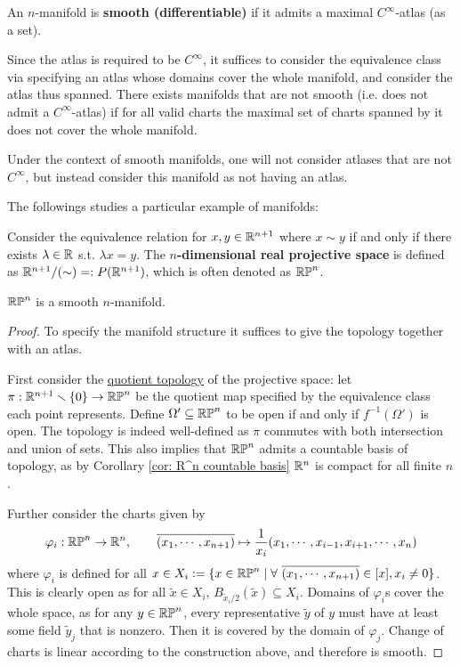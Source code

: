 \documentclass{article}
\begin{document}
\begin{definition}
    An $n$-manifold is \textbf{smooth (differentiable)} if it admits a maximal $C^{\infty}$-atlas (as a set). 
\end{definition}

\begin{remark}
    Since the atlas is required to be $C^{\infty}$, it suffices to consider the equivalence class via specifying an atlas whose domains cover the whole manifold, and consider the atlas thus spanned. There exists manifolds that are not smooth (i.e. does not admit a $C^{\infty}$-atlas) if for all valid charts the maximal set of charts spanned by it does not cover the whole manifold.
    
    Under the context of smooth manifolds, one will not consider atlases that are not $C^{\infty}$, but instead consider this manifold as not having an atlas.
\end{remark}

The followings studies a particular example of manifolds:

\begin{definition}
    Consider the equivalence relation for $x, y \in \mathbb{R}^{n+1}$ where $x \sim y$ if and only if there exists $\lambda \in \mathbb{R}$ s.t. $\lambda x = y$. The \textbf{$n$-dimensional real projective space} is defined as $\mathbb{R}^{n+1}/(\sim) =: P(\mathbb{R}^{n+1})$, which is often denoted as $\mathbb{RP}^n$.
\end{definition}

\begin{proposition}
    $\mathbb{RP}^n$ is a smooth $n$-manifold.
\end{proposition}

\begin{proof}
    To specify the manifold structure it suffices to give the topology together with an atlas. 

    First consider the \underline{quotient topology} of the projective space: let $\pi: \mathbb{R}^{n+1} \smallsetminus \{0\} \to \mathbb{RP}^n$ be the quotient map specified by the equivalence class each point represents. Define $\Omega' \subseteq \mathbb{RP}^n$ to be open if and only if $f^{-1}(\Omega')$ is open. The topology is indeed well-defined as $\pi$ commutes with both intersection and union of sets. This also implies that $\mathbb{RP}^n$ admits a countable basis of topology, as by Corollary \ref{cor: R^n countable basis} $\mathbb{R}^{n}$ is compact for all finite $n$.

    Further consider the charts given by
    \[
        \varphi_i: \mathbb{RP}^n \to \mathbb{R}^n, \qquad \overline{(x_1, \cdots, x_{n+1})} \mapsto \frac{1}{x_{i}} (x_1, \cdots, x_{i-1}, x_{i+1}, \cdots, x_{n})
    \]
    where $\varphi_i$ is defined for all $x \in X_i := \{x \in \mathbb{RP}^n \mid \forall\  \overline{(x_1, \cdots, x_{n+1})} \in [x], x_i \neq 0\}$. This is clearly open as for all $\tilde{x} \in X_i$, $B_{\tilde{x}_i/2}(\tilde{x}) \subseteq X_i$. Domains of $\varphi_i$s cover the whole space, as for any $y \in \mathbb{RP}^n$, every representative $\tilde{y}$ of $y$ must have at least some field $\tilde{y}_j$ that is nonzero. Then it is covered by the domain of $\varphi_j$. Change of charts is linear according to the construction above, and therefore is smooth.
\end{proof}
\end{document}
